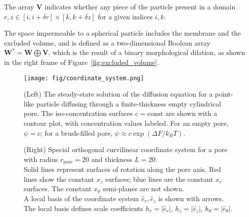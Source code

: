 \documentclass[10pt, a4paper]{article}
\begin{document}
\begin{multicols}{2}
The array $\bm{V}$ indicates whether any piece of the particle present in a domain $r,z \in [i, i + \delta r] \times [k, k + \delta z]$ for a given indices $i,k$.

The space impermeable to a spherical particle includes the membrane and the excluded volume, and is defined as a two-dimensional Boolean array $\bm{W}^{\ast} = \bm{W} \bigoplus \bm{V}$, which is the result of a binary morphological dilation, as shown in the right frame of Figure~\ref{fig:excluded_volume}.

\end{multicols}



\begin{figure*}[h]
    \centering
    \texttt{[image: fig/coordinate\_system.png]}
    \caption{
        (Left)
        The steady-state solution of the diffusion equation for a point-like particle diffusing through a finite-thickness empty cylindrical pore.
        The iso-concentration surfaces $c = \textrm{const}$ are shown with a contour plot, with concentration values labeled.
        For an empty pore, $\psi = c$; for a brush-filled pore, $\psi \approx c \exp(\Delta F / k_B T)$.
    }
    \label{fig:empty_pore_solution}
    \caption{
        (Right)
        Special orthogonal curvilinear coordinate system for a pore with radius $r_{\textrm{pore}} = 20$ and thickness $L = 20$.
        \\
        Solid lines represent surfaces of rotation along the pore axis.
        Red lines show the constant $x_{z}$ surfaces; blue lines are the constant $x_{r}$ surfaces.
        The constant $x_{\theta}$ semi-planes are not shown.
        \\
        A local basis of the coordinate system $\hat{e}_r, \hat{e}_z$ is shown with arrows.
        The local basis defines scale coefficients $h_r = |\hat{e}_r|$, $h_z = |\hat{e}_z|$, $h_{\theta} = |\hat{e}_{\theta}|$.
        }
    \label{fig:coordinate_system}
\end{figure*}

\pagebreak
\end{document}
